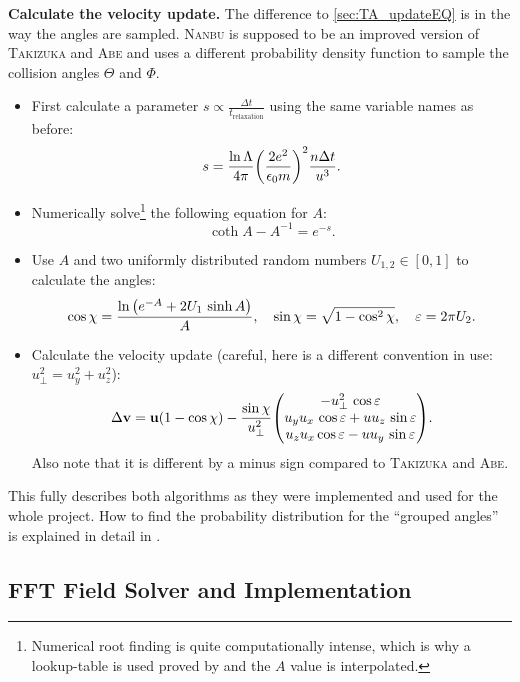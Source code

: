 \textbf{Calculate the velocity update.} The difference to \ref{sec:TA_updateEQ} is in the way the angles are sampled. \textsc{Nanbu} is supposed to be an improved version of \textsc{Takizuka} and \textsc{Abe} and uses a different probability density function to sample the collision angles $\Theta$ and $\Phi$.
\begin{itemize}
    \item First calculate a parameter $s \propto \frac{\Delta t}{t_\mathrm{relaxation}}$ using the same variable names as before:
    $$
    s = \frac{\ln\Lambda}{4\pi} \qty(\frac{2 e^2}{\epsilon_0 m})^2 \frac{n \Delta t}{u^3} .
    $$
    \item Numerically solve\footnote{Numerical root finding is quite computationally intense, which is why a lookup-table is used proved by \cite[4644]{Nanbu1997} and the $A$ value is interpolated.} the following equation for $A$:
    $$
    \coth A - A^{-1} = e^{-s} .
    $$
    \item Use $A$ and two uniformly distributed random numbers $U_{1,2} \in [0, 1]$ to calculate the angles:
    $$
    \cos\chi = \frac{\ln\qty(e^{-A} + 2 U_1 \, \sinh A)}{A}, 
    \quad\sin\chi = \sqrt{1 - \cos^2\chi},
    \quad\varepsilon = 2\pi U_2 .
    $$
    \item Calculate the velocity update (careful, here is a different convention in use: $u_\perp^2 = u_y^2+u_z^2$): 
    $$
    \Delta \mathbf{v} =  \mathbf{u} \qty(1 - \cos\chi) - \frac{\sin\chi}{u_\perp^2} \mqty(-u_\perp^2 \, \cos\varepsilon \\ u_yu_x\,\cos\varepsilon + uu_z \,\sin\varepsilon \\ u_zu_x \cos\varepsilon - uu_y \,\sin\varepsilon) .
    $$
    Also note that it is different by a minus sign compared to \textsc{Takizuka} and \textsc{Abe}.
\end{itemize}
This fully describes both algorithms as they were implemented and used for the whole project. How to find the probability distribution for the ``grouped angles'' is explained in detail in \cite[4644]{Nanbu1997}.


\subsection{FFT Field Solver and Implementation}\label{sec:FieldSolverImplementation}


